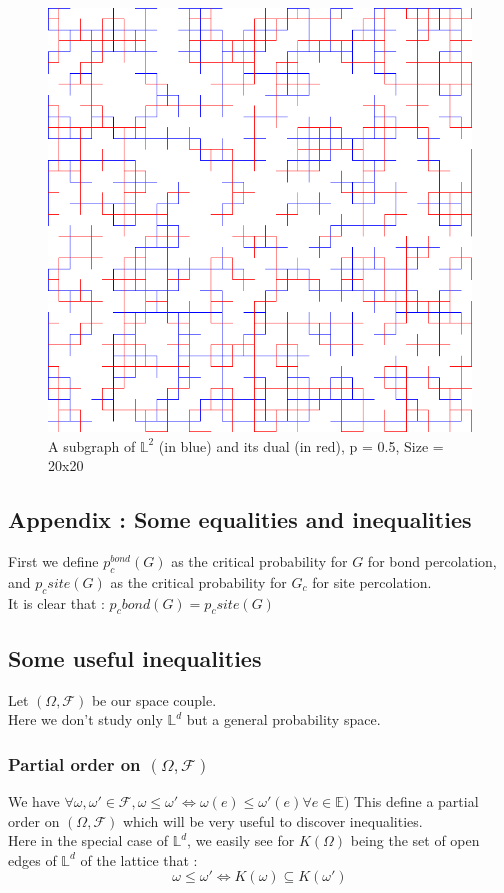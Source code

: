 \documentclass{article}
\begin{document}
\begin{figure}[ht]
\includegraphics[scale=0.5]{dual}
\centering

\caption{A subgraph of $\mathbb{L}^2$ (in blue) and its dual (in red), p = 0.5, Size = 20x20}
\end{figure}

\subsection{Appendix : Some equalities and inequalities}

First we define $p_c^{bond}(G)$ as the critical probability for $G$ for bond percolation, and $p_c{site}(G)$ as the critical probability for $G_c$ for site percolation. \\
It is clear that : $p_c{bond}(G) = p_c{site}(G)$

\subsection{Some useful inequalities}
Let $(\Omega, \mathscr{F})$ be our space couple. \\
Here we don't study only $\mathbb{L}^d$ but a general probability space. \\

\subsubsection{Partial order on $(\Omega, \mathscr{F})$}
We have $\forall \omega, \omega' \in \mathscr{F}, \omega \leq \omega' \Longleftrightarrow \omega(e) \leq \omega'(e) \forall e \in \mathbb{E})$
This define a partial order on $(\Omega, \mathscr{F})$ which will be very useful to discover inequalities.\\
Here in the special case of $\mathbb{L}^d$, we easily see for $K(\Omega)$ being the set of open edges of $\mathbb{L}^d$ of the lattice that :
$$\omega \leq \omega' \Longleftrightarrow K(\omega) \subseteq K(\omega')$$
\end{document}
